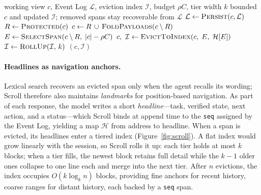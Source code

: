 \begin{algorithm}[t]
\caption{Recoverable context eviction}
\label{alg:eviction}
\begin{algorithmic}[1]
\Input working view $c$, Event Log $\mathcal{L}$, eviction index $\mathcal{I}$, budget $\rho C$, tier width $k$
\Output bounded $c$ and updated $\mathcal{I}$; removed spans stay recoverable from $\mathcal{L}$
  \State $\mathcal{L} \gets \Call{Persist}{c, \mathcal{L}}$
  \State $R \gets \Call{Protected}{c}$
  \State $c \gets R \,\cup\, \Call{FoldPayloads}{c \setminus R}$
  \State $E \gets \Call{SelectSpan}{c \setminus R,\; |c| - \rho C}$
  \State $c,\ \mathcal{I} \gets \Call{EvictToIndex}{c,\; E,\; \mathcal{H}[E]}$
  \State $\mathcal{I} \gets \Call{RollUp}{\mathcal{I},\, k}$
\EndIf
\State \Return $(c, \mathcal{I})$
\end{algorithmic}
\end{algorithm}

\paragraph{Headlines as navigation anchors.}
Lexical search recovers an evicted span only when the agent recalls its wording; Scroll therefore also maintains \emph{landmarks} for position-based navigation. As part of each response, the model writes a short \emph{headline}---task, verified state, next action, and a status---which Scroll binds at append time to the \texttt{seq} assigned by the Event Log, yielding a map $\mathcal{H}$ from address to headline. When a span is evicted, its headlines enter a tiered index (Figure~\ref{fig:scroll}). 
A flat index would grow linearly with the session, so Scroll rolls it up: each tier holds at most $k$ blocks; when a tier fills, the newest block retains full detail while the $k-1$ older ones collapse to one line each and merge into the next tier.
After $n$ evictions, the index occupies $O(k \log_k n)$ blocks, providing fine anchors for recent history, coarse ranges for distant history, each backed by a \texttt{seq} span.